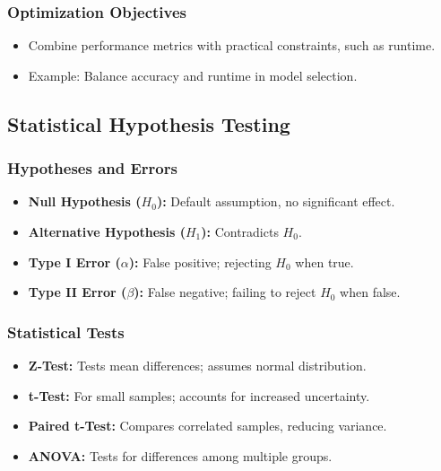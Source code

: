 \subsubsection{Optimization Objectives}
\begin{itemize}
    \item Combine performance metrics with practical constraints, such as runtime.
    \item Example: Balance accuracy and runtime in model selection.
\end{itemize}

\subsection{Statistical Hypothesis Testing}
\subsubsection{Hypotheses and Errors}
\begin{itemize}
    \item \textbf{Null Hypothesis (\( H_0 \)):} Default assumption, no significant effect.
    \item \textbf{Alternative Hypothesis (\( H_1 \)):} Contradicts \( H_0 \).
    \item \textbf{Type I Error (\( \alpha \)):} False positive; rejecting \( H_0 \) when true.
    \item \textbf{Type II Error (\( \beta \)):} False negative; failing to reject \( H_0 \) when false.
\end{itemize}

\subsubsection{Statistical Tests}
\begin{itemize}
    \item \textbf{Z-Test:} Tests mean differences; assumes normal distribution.
    \item \textbf{t-Test:} For small samples; accounts for increased uncertainty.
    \item \textbf{Paired t-Test:} Compares correlated samples, reducing variance.
    \item \textbf{ANOVA:} Tests for differences among multiple groups.
\end{itemize}

